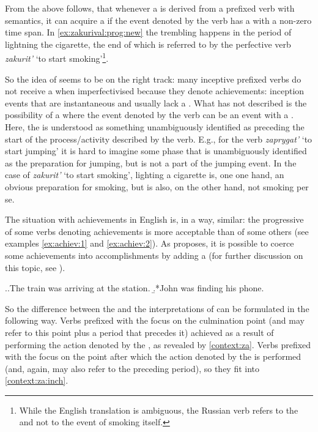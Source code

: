 From the above follows, that whenever a  is derived from a  prefixed verb with  semantics, it can acquire a  if the event denoted by the verb has a  with a non-zero time span. In \ref{ex:zakurival:prog:new} the trembling happens in the period of lightning the cigarette, the end of which is referred to by the perfective verb \textit{zakurit'} `to start smoking'\footnote{While the English translation is ambiguous, the Russian verb refers to the  and not to the event of smoking itself.}. 

So the idea of \citet{Braginsky:08} seems to be on the right track: many inceptive prefixed verbs do not receive a  when imperfectivised because they denote achievements: inception events that are instantaneous and usually lack a . What \citet{Braginsky:08} has not described is the possibility of a  where the event denoted by the verb can be  an event with a . Here, the  is understood as something unambiguously identified as preceding the start of the process/activity described by the  verb. E.g., for the verb \textit{zaprygat'} `to start jumping' it is hard to imagine some phase that is unambiguously identified as the preparation for jumping, but is not a part of the jumping event. In the case of \textit{zakurit'} `to start smoking', lighting a cigarette is, one one hand, an obvious preparation for smoking, but is also, on the other hand, not smoking per se. 

The situation with achievements in English is, in a way, similar: the progressive of some verbs denoting achievements is more acceptable than of some others (see examples \ref{ex:achiev:1} and \ref{ex:achiev:2}). As \citet{Rothstein:04} proposes, it is possible to coerce some achievements into accomplishments by adding a  (for further discussion on this topic, see \citealt{Gyarmathy:15}).

\ex.\a.\label{ex:achiev:1}The train was arriving at the station.
\b.*John was finding his phone.\label{ex:achiev:2}

So the difference between the  and the  interpretations of  can be formulated in the following way. Verbs prefixed with the   focus on the culmination point (and may refer to this point plus a period that precedes it) achieved as a result of performing the action denoted by the , as revealed by  \ref{context:za}. Verbs prefixed with the   focus on the point after which the action denoted by the  is performed (and, again, may also refer to the preceding period), so they fit into  \ref{context:za:inch}.

